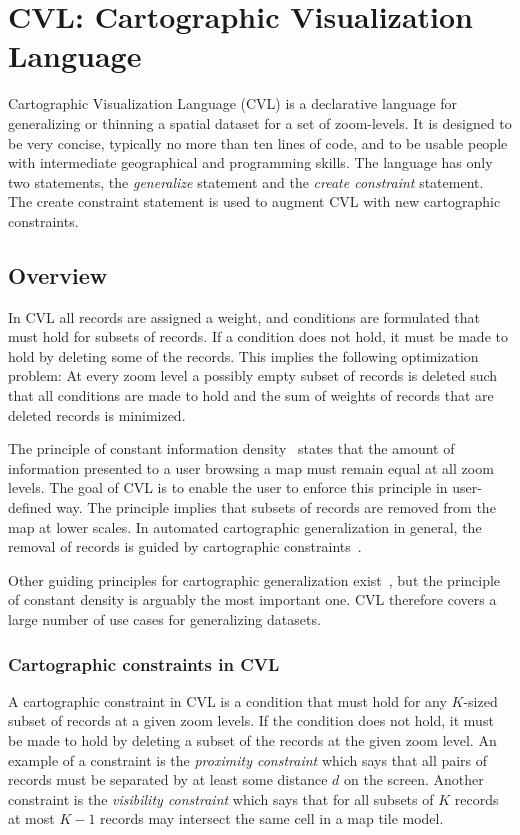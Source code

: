 \section{CVL: Cartographic Visualization Language}
\label{sec:cvl-language}
Cartographic Visualization Language (CVL) is a declarative language for generalizing or thinning a spatial dataset for a set of zoom-levels. It is designed to be very concise, typically no more than ten lines of code, and to be usable people with intermediate geographical and programming skills. The language has only two statements, the \emph{generalize} statement and the \emph{create constraint} statement. The create constraint statement is used to augment CVL with new cartographic constraints.

\subsection{Overview}

In CVL all records are assigned a weight, and conditions are formulated that must hold for subsets of records. If a condition does not hold, it must be made to hold by deleting some of the records. This implies the following optimization problem: At every zoom level a possibly empty subset of records is deleted such that all conditions are made to hold and the sum of weights of records that are deleted records is minimized.

The principle of constant information density~\cite{toepfer} states that the amount of information presented to a user browsing a map must remain equal at all zoom levels. The goal of CVL is to enable the user to enforce this principle in user-defined way. The principle implies that subsets of records are removed from the map at lower scales. In automated cartographic generalization in general, the removal of records is guided by cartographic constraints~\cite{something}.

Other guiding principles for cartographic generalization exist~\cite{something}, but the principle of constant density is arguably the most important one. CVL therefore covers a large number of use cases for generalizing datasets.



\subsubsection{Cartographic constraints in CVL}

A cartographic constraint in CVL is a condition that must hold for any $K$-sized subset of records at a given zoom levels. If the condition does not hold, it must be made to hold by deleting a subset of the records at the given zoom level. An example of a constraint is the \emph{proximity constraint} which says that all pairs of records must be separated by at least some distance $d$ on the screen. Another constraint is the \emph{visibility constraint} which says that for all subsets of $K$ records at most $K-1$ records may intersect the same cell in a map tile model.

